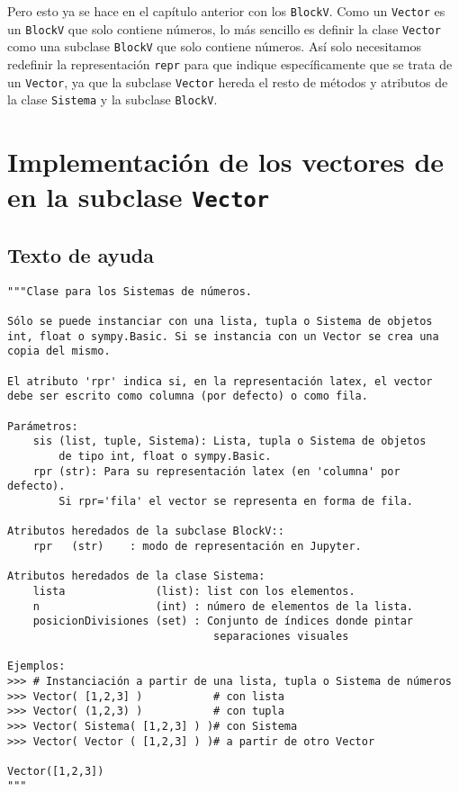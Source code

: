 \documentclass[11pt]{report}
\begin{document}
Pero esto ya se hace en el capítulo anterior con los \texttt{BlockV}. Como un
\texttt{Vector} es un \texttt{BlockV} que solo contiene números, lo más sencillo es
definir la clase \texttt{Vector} como una subclase \texttt{BlockV} que solo contiene
números. Así solo necesitamos redefinir la representación \texttt{repr} para
que indique específicamente que se trata de un \texttt{Vector}, ya que la
subclase \texttt{Vector} hereda el resto de métodos y atributos de la clase
\texttt{Sistema} y la subclase \texttt{BlockV}.

\section{Implementación de los vectores de \R[n] en la subclase \texttt{Vector}}
\label{sec:org56ffd9d}

\subsection{Texto de ayuda}
\label{sec:org0fb94da}

\begin{verbatim}
"""Clase para los Sistemas de números.

Sólo se puede instanciar con una lista, tupla o Sistema de objetos
int, float o sympy.Basic. Si se instancia con un Vector se crea una
copia del mismo.

El atributo 'rpr' indica si, en la representación latex, el vector
debe ser escrito como columna (por defecto) o como fila.

Parámetros:
    sis (list, tuple, Sistema): Lista, tupla o Sistema de objetos
        de tipo int, float o sympy.Basic.
    rpr (str): Para su representación latex (en 'columna' por defecto).
        Si rpr='fila' el vector se representa en forma de fila. 

Atributos heredados de la subclase BlockV::
    rpr   (str)    : modo de representación en Jupyter.

Atributos heredados de la clase Sistema:
    lista              (list): list con los elementos.
    n                  (int) : número de elementos de la lista.
    posicionDivisiones (set) : Conjunto de índices donde pintar
                                separaciones visuales

Ejemplos:
>>> # Instanciación a partir de una lista, tupla o Sistema de números
>>> Vector( [1,2,3] )           # con lista
>>> Vector( (1,2,3) )           # con tupla
>>> Vector( Sistema( [1,2,3] ) )# con Sistema
>>> Vector( Vector ( [1,2,3] ) )# a partir de otro Vector

Vector([1,2,3])
"""
\end{verbatim}
\end{document}
